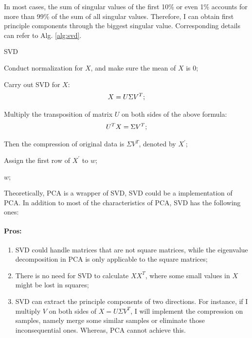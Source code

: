 \documentclass[12pt,a4paper]{article}
\theoremstyle{definition}
\begin{document}
In most cases, the sum of singular values of the first 10\% or even 1\% accounts for more than 99\% of the sum of all singular values. Therefore, I can obtain first principle components through the biggest singular value. Corresponding details can refer to Alg. \ref{alg:svd}.

\vspace{0.01\linewidth}
\begin{algorithm}[H]
	\caption{SVD}
	\label{alg:svd}
	\vspace{0.25\baselineskip}
	
	
	Conduct normalization for $X$, and make sure the mean of $X$ is 0;
	
	Carry out SVD for $X$:
	\begin{equation*}
		\centering
		X = U \Sigma V^T;
	\end{equation*}
	
	Multiply the transposition of matrix $U$ on both sides of the above formula:
	\begin{equation*}
		\centering
		U^TX = \Sigma V^T;
	\end{equation*}
	
	Then the compression of original data is $\Sigma V^T$, denoted by $X^{'}$;
	
	Assign the first row of $X^{'}$ to $w$;
	
	\Return $w$;
\end{algorithm}
\vspace{0.01\linewidth}

Theoretically, PCA is a wrapper of SVD, SVD could be a implementation of PCA. In addition to most of the characteristics of PCA, SVD has the following ones:

\vspace{-0.012\linewidth}
\paragraph{Pros:}
\begin{enumerate}
	\item SVD could handle matrices that are not square matrices, while the eigenvalue decomposition in PCA is only applicable to the square matrices;
	
	\item There is no need for SVD to calculate $XX^T$, where some small values in $X$ might be lost in squares;
	
	\item SVD can extract the principle components of two directions. For instance, if I multiply $V$ on both sides of $X=U \Sigma V^T$, I will implement the compression on samples, namely merge some similar samples or eliminate those inconsequential ones. Whereas, PCA cannot achieve this.
\end{enumerate}
\end{document}
